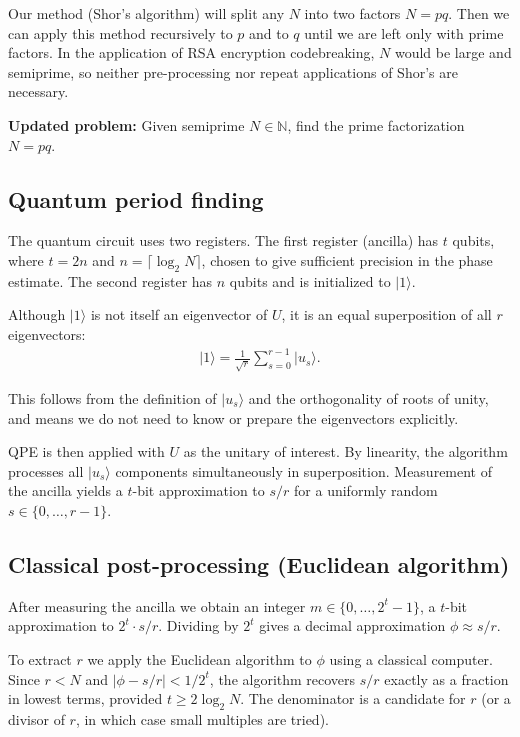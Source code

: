 \documentclass[11pt]{article}
\begin{document}
Our method (Shor's algorithm) will split any $N$ into two factors $N=pq$. Then we can apply this method recursively to $p$ and to $q$ until we are left only with prime factors. In the application of RSA encryption codebreaking, $N$ would be large and semiprime, so neither pre-processing nor repeat applications of Shor's are necessary.

\textbf{Updated problem:} Given semiprime $N \in \mathbb{N}$, find the prime factorization $N = pq$.

\subsection{Quantum period finding}

The quantum circuit uses two registers. The first register (ancilla) has $t$ qubits, where $t = 2n$ and $n = \lceil \log_2 N \rceil$, chosen to give sufficient precision in the phase estimate. The second register has $n$ qubits and is initialized to $\vert 1 \rangle$.

Although $\vert 1 \rangle$ is not itself an eigenvector of $U$, it is an equal superposition of all $r$ eigenvectors:
\begin{align*}
\vert 1 \rangle = \frac{1}{\sqrt{r}}\sum_{s=0}^{r-1}\vert u_s \rangle.
\end{align*}

This follows from the definition of $\vert u_s \rangle$ and the orthogonality of roots of unity, and means we do not need to know or prepare the eigenvectors explicitly.

QPE is then applied with $U$ as the unitary of interest. By linearity, the algorithm processes all $\vert u_s \rangle$ components simultaneously in superposition. Measurement of the ancilla yields a $t$-bit approximation to $s/r$ for a uniformly random $s \in \{0, \ldots, r-1\}$.

\subsection{Classical post-processing (Euclidean algorithm)}

After measuring the ancilla we obtain an integer $m \in \{0, \ldots, 2^t - 1\}$, a $t$-bit approximation to $2^t \cdot s/r$. Dividing by $2^t$ gives a decimal approximation $\phi \approx s/r$.

To extract $r$ we apply the Euclidean algorithm to $\phi$ using a classical computer. Since $r < N$ and $|\phi - s/r| < 1/2^t$, the algorithm recovers $s/r$ exactly as a fraction in lowest terms, provided $t \geq 2\log_2 N$. The denominator is a candidate for $r$ (or a divisor of $r$, in which case small multiples are tried).
\end{document}
